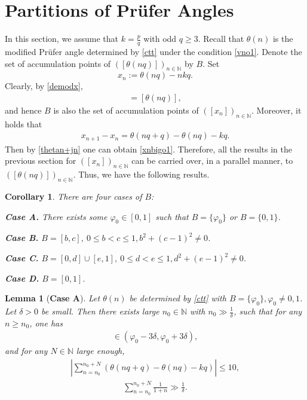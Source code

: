 \documentclass[12pt]{amsart}
\newcommand{\abs}[1]{\left\lvert #1 \right\rvert}
\theoremstyle{plain}
\newtheorem{corollary}[theorem]{Corollary}
\newtheorem{lemma}[theorem]{Lemma}
\theoremstyle{definition}
\begin{document}
\section{Partitions of Pr\"ufer Angles}\label{secparpru}
In this section, we assume that $k=\frac{p}{q}$ with odd $q\geq 3$. Recall that $\theta(n)$ is the modified Pr\"ufer angle determined by \eqref{ctt} under the condition \eqref{vno1}.
Denote the set of accumulation points of $(\left[\theta(nq)\right])_{n\in\mathbb{N}}$ by $B$. Set $$x_n:=\theta(nq)-nkq.$$ 
Clearly, by \eqref{demodx},
\begin{align}
	[x_n]=\left[\theta(nq)\right],\nonumber
\end{align}
and hence
$B$ is also the set of accumulation points of $(\left[x_n\right])_{n\in\mathbb{N}}$. Moreover, it holds that
\begin{align}
	x_{n+1}-x_n=\theta(nq+q)-\theta(nq)-kq.\nonumber
\end{align}
Then by \eqref{thetan+jn} one can obtain \eqref{xnbigo1}. Therefore, all the results in the previous section for $(\left[x_n\right])_{n\in\mathbb{N}}$  can be carried over, in a parallel manner, to $(\left[\theta(nq)\right])_{n\in\mathbb{N}}$. Thus, we have the following results.
\begin{corollary}\label{corangle}
	 There are four cases of $B$:
	
	\textbf{Case A.} There exists some $\varphi_0\in [0,1]$ such that $	B=\{\varphi_0\}$ or $B=\{0,1\}$.
	
	\textbf{Case B.}  $B=[b,c],\ 0\leq b<c\leq 1, b^2+(c-1)^2\neq 0$.
	
	\textbf{Case C.} $B=[0,d]\cup [e,1], \ 0\leq d<e\leq 1,d^2+(e-1)^2\neq0$.

	
		\textbf{Case D.} $B=[0,1].$
\end{corollary}
\begin{lemma}[\textbf{Case A}]\label{caseA}
Let $\theta(n)$ be determined by \eqref{ctt} with $B=\{\varphi_0\},\varphi_0\neq 0,1$. Let $\delta>0$ be small.  Then there exists large $n_0\in\mathbb{N}$ with $n_0\gg \frac{1}{\delta}$, such that 
for any $n\geq n_0$, one has
\begin{align}
	[\theta(nq)]\in (\varphi_0-3\delta,\varphi_0+3\delta),\label{caseAaiinuitilde}
\end{align}
and for any $N\in\mathbb{N}$ large enough,
\begin{align}
	\abs{\sum_{n=n_0}^{n_0+N}(\theta(nq+q)-\theta(nq)-kq)}\leq 10,\label{caseAaiminusbileq10}
\end{align}
\begin{align}
\sum_{n=n_0}^{n_0+N}\frac{1}{1+n}\gg \frac{1}{\delta}.\label{caseAIifractionlarge}
\end{align}
\end{lemma}
\end{document}
